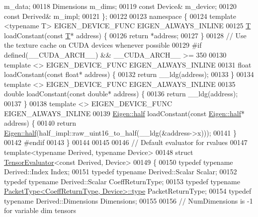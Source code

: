 \begin{DoxyCode}
       m\_data;
00118   Dimensions m\_dims;
00119   \textcolor{keyword}{const} Device& m\_device;
00120   \textcolor{keyword}{const} Derived& m\_impl;
00121 \};
00122 
00123 \textcolor{keyword}{namespace }\{
00124 \textcolor{keyword}{template} <\textcolor{keyword}{typename} T> EIGEN\_DEVICE\_FUNC EIGEN\_ALWAYS\_INLINE
00125 \hyperlink{group___sparse_core___module}{T} loadConstant(\textcolor{keyword}{const} \hyperlink{group___sparse_core___module}{T}* address) \{
00126   \textcolor{keywordflow}{return} *address;
00127 \}
00128 \textcolor{comment}{// Use the texture cache on CUDA devices whenever possible}
00129 \textcolor{preprocessor}{#if defined(\_\_CUDA\_ARCH\_\_) && \_\_CUDA\_ARCH\_\_ >= 350}
00130 \textcolor{keyword}{template} <> EIGEN\_DEVICE\_FUNC EIGEN\_ALWAYS\_INLINE
00131 \textcolor{keywordtype}{float} loadConstant(\textcolor{keyword}{const} \textcolor{keywordtype}{float}* address) \{
00132   \textcolor{keywordflow}{return} \_\_ldg(address);
00133 \}
00134 \textcolor{keyword}{template} <> EIGEN\_DEVICE\_FUNC EIGEN\_ALWAYS\_INLINE
00135 \textcolor{keywordtype}{double} loadConstant(\textcolor{keyword}{const} \textcolor{keywordtype}{double}* address) \{
00136   \textcolor{keywordflow}{return} \_\_ldg(address);
00137 \}
00138 \textcolor{keyword}{template} <> EIGEN\_DEVICE\_FUNC EIGEN\_ALWAYS\_INLINE
00139 \hyperlink{struct_eigen_1_1half}{Eigen::half} loadConstant(\textcolor{keyword}{const} \hyperlink{struct_eigen_1_1half}{Eigen::half}* address) \{
00140   \textcolor{keywordflow}{return} \hyperlink{struct_eigen_1_1half}{Eigen::half}(half\_impl::raw\_uint16\_to\_half(\_\_ldg(&address->x)));
00141 \}
00142 \textcolor{preprocessor}{#endif}
00143 \}
00144 
00145 
00146 \textcolor{comment}{// Default evaluator for rvalues}
00147 \textcolor{keyword}{template}<\textcolor{keyword}{typename} Derived, \textcolor{keyword}{typename} Device>
00148 \textcolor{keyword}{struct }\hyperlink{struct_eigen_1_1_tensor_evaluator}{TensorEvaluator}<const Derived, Device>
00149 \{
00150   \textcolor{keyword}{typedef} \textcolor{keyword}{typename} Derived::Index Index;
00151   \textcolor{keyword}{typedef} \textcolor{keyword}{typename} Derived::Scalar Scalar;
00152   \textcolor{keyword}{typedef} \textcolor{keyword}{typename} Derived::Scalar CoeffReturnType;
00153   \textcolor{keyword}{typedef} \textcolor{keyword}{typename} \hyperlink{group___sparse_core___module}{PacketType<CoeffReturnType, Device>::type} 
      PacketReturnType;
00154   \textcolor{keyword}{typedef} \textcolor{keyword}{typename} Derived::Dimensions Dimensions;
00155 
00156   \textcolor{comment}{// NumDimensions is -1 for variable dim tensors}

\end{DoxyCode}

